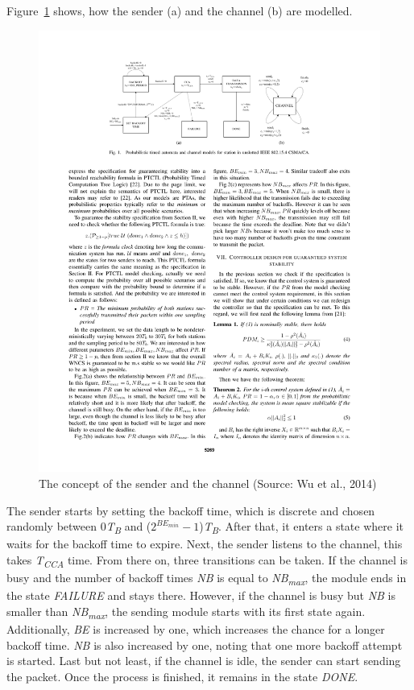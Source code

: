 \documentclass[
a4paper,
12pt
]{scrartcl}
\begin{document}
Figure~\ref{IEEE802:pdf} \cite{stability} shows, how the sender (a) and the channel (b) are modelled.

\begin{figure}[ht!]
  \centering
\includegraphics[page=1]{data/stability_cropped.pdf}
\caption{The concept of the sender and the channel (Source: Wu et al., 2014)}
\label{IEEE802:pdf}
\end{figure}

The sender starts by setting the backoff time, which is discrete and chosen randomly between 0\textit{T\textsubscript{B}} and ($2^{BE_{min}} - 1$)\textit{T\textsubscript{B}}. After that, it enters a state where it waits for the backoff time to expire. Next, the sender listens to the channel, this takes \textit{T\textsubscript{CCA}} time. From there on, three transitions can be taken. If the channel is busy and the number of backoff times \textit{NB} is equal to \textit{NB\textsubscript{max}}, the module ends in the state \textit{FAILURE} and stays there. However, if the channel is busy but \textit{NB} is smaller than \textit{NB\textsubscript{max}}, the sending module starts with its first state again. Additionally, \textit{BE} is increased by one, which increases the chance for a longer backoff time. \textit{NB} is also increased by one, noting that one more backoff attempt is started. Last but not least, if the channel is idle, the sender can start sending the packet. Once the process is finished, it remains in the state \textit{DONE}.
\end{document}
